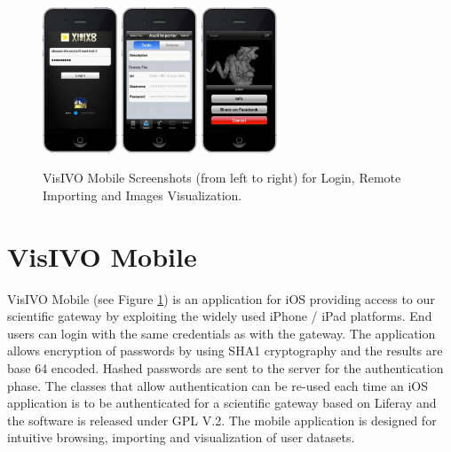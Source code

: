 \begin{figure}
    \centering
    \includegraphics[width=0.2\textwidth]{part5/Costa_O08/O08_f3.eps}
    \includegraphics[width=0.2\textwidth]{part5/Costa_O08/O08_f4.eps}
    \includegraphics[width=0.2\textwidth]{part5/Costa_O08/O08_f5.eps}
    \caption{VisIVO Mobile Screenshots (from left to right) for Login, Remote Importing and Images Visualization.}
\label{fig:visivomobile}
\end{figure}

\section{VisIVO Mobile}
VisIVO Mobile  (see Figure \ref{fig:visivomobile}) is an application for iOS providing access to our scientific gateway by exploiting the widely used iPhone / iPad platforms. End users can login with the same credentials as with the gateway. The application allows encryption of passwords by using SHA1 cryptography and the results are base 64 encoded. Hashed passwords are sent to the server for the authentication phase. The classes that allow authentication can be re-used each time an iOS application is to be authenticated for a scientific gateway based on Liferay  and the software is released under GPL V.2. The mobile application is designed for intuitive browsing, importing and visualization of user datasets.
